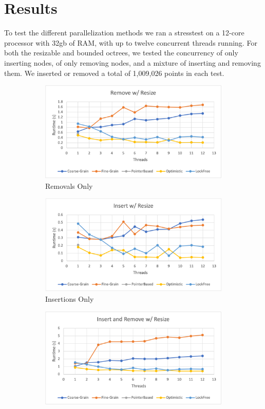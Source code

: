 \documentclass[conference]{IEEEtran}
\begin{document}
\section{Results} \label{sec:sec5}
To test the different parallelization methods we ran a stresstest on a 12-core processor with 32gb of RAM, with up to twelve concurrent threads running. For both the resizable and bounded octrees, we tested the concurrency of only inserting nodes, of only removing nodes, and a mixture of inserting and removing them. We inserted or removed a total of 1,009,026 points in each test. 


\begin{figure}[h!]
    \centering
    \begin{subfigure}{.5\textwidth}
		\includegraphics[width=\textwidth]{V1Remove.png}
		\caption{Removals Only}
		\label{fig:fig1a}
	\end{subfigure}
	\begin{subfigure}{.5\textwidth}
		\includegraphics[width=\textwidth]{V1Insert.png}
		\caption{Insertions Only}
		\label{fig:fig1b}
	\end{subfigure}
	\begin{subfigure}{.5\textwidth}
		\includegraphics[width=\textwidth]{V1InsertRemove.png}

\end{subfigure}
\end{figure}
\end{document}
